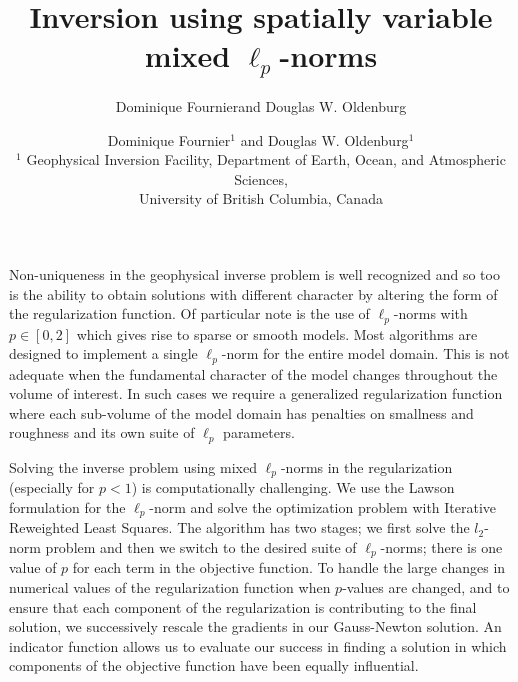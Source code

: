 \documentclass[extra,referee]{gji}
\begin{document}
\title{Inversion using spatially variable mixed $\ell_p$-norms}


\author{Dominique Fournier\footnotemark[1] and Douglas W. Oldenburg\footnotemark[1]}
\author[D. Fournier, D. W. Oldenburg]
{Dominique Fournier$^1$ and Douglas W. Oldenburg$^1$ \\
$^1$ Geophysical Inversion Facility, Department of Earth, Ocean, and Atmospheric Sciences,\\
University of British Columbia, Canada
}


\maketitle

\begin{summary}

Non-uniqueness in the geophysical inverse problem is well recognized and so too is the ability to obtain solutions with different character by altering the form of the regularization function. Of particular note is the use of $\ell_p$-norms with $p \in [0,2]$ which gives rise to sparse or smooth models. Most algorithms are designed to implement a single $\ell_p$-norm for the entire model domain. This is not adequate when the fundamental character of the model changes throughout the volume of interest. In such cases we require a generalized regularization function where each sub-volume of the model domain has penalties on smallness and roughness and its own suite of $\ell_p$ parameters.

Solving the inverse problem using mixed $\ell_p$-norms in the regularization (especially for $p<1$) is computationally challenging. We use the Lawson formulation for the $\ell_p$-norm and solve the optimization problem with Iterative Reweighted Least Squares. The algorithm has two stages; we first solve the $l_2$-norm problem and then we switch to the desired suite of $\ell_p$-norms; there is one value of $p$ for each term in the objective function. To handle the large changes in numerical values of the regularization function when $p$-values are changed, and to ensure that each component of the regularization is contributing to the final solution, we successively rescale the gradients in our Gauss-Newton solution. An indicator function allows us to evaluate our success in finding a solution in which components of the objective function have been equally influential.


\end{summary}
\end{document}
